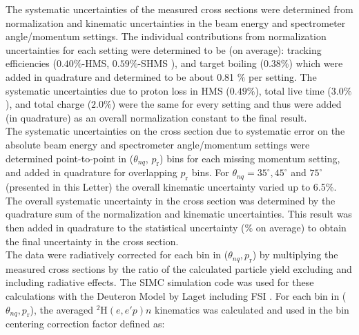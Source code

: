 \indent The systematic uncertainties of the measured cross sections were determined from 
normalization and kinematic uncertainties in the beam energy and spectrometer angle/momentum settings. The individual
contributions from normalization uncertainties for each setting were determined to be (on average): tracking efficiencies ($0.40 \%$-HMS, $0.59 \%$-SHMS ),
and target boiling ($0.38 \%$) which were added in quadrature and determined to be about 0.81 $\%$ per setting. The systematic uncertainties due to
proton loss in HMS ($0.49 \%$), total live time ($3.0 \%$), and total charge ($2.0\%$) were the same for every setting and thus were added (in quadrature)
as an overall normalization constant to the final result.\\
\indent The systematic uncertainties on the cross section due to systematic error on the absolute beam energy and spectrometer angle/momentum settings were
determined point-to-point in ($\theta_{nq}$, $p_{\mathrm{r}}$) bins for each missing momentum setting, and added in quadrature for overlapping $p_{\mathrm{r}}$ bins. 
For $\theta_{nq}= 35^{\circ}, 45^{\circ}$ and $75^{\circ}$ (presented in this Letter) the overall kinematic uncertainty varied up to 6.5$\%$.
The overall systematic uncertainty in the cross section was determined by the quadrature sum of the normalization and kinematic uncertainties. This result was then added in quadrature
to the statistical uncertainty (\DIFdelbegin {}\DIFdelend \DIFaddbegin {}\DIFaddend $\%$ on average) to obtain the final uncertainty in the cross section. \\
\indent The data were radiatively corrected for each bin in ($\theta_{nq}, p_{\mathrm{r}}$) by multiplying the measured cross sections by the ratio of the calculated particle yield excluding and including radiative effects. The SIMC simulation code was used for these calculations with the Deuteron Model by Laget including FSI \cite{LAGET2005}.
For each bin in ($\theta_{nq}, p_{\mathrm{r}}$), the averaged $^{2}\mathrm{H}(e,e'p)n$ kinematics was calculated and used in the bin centering correction factor defined as:
